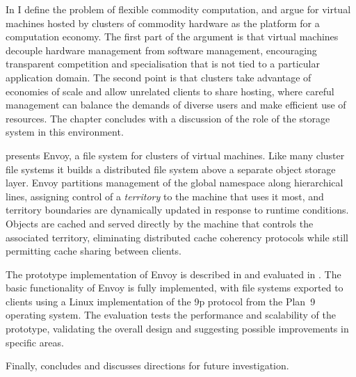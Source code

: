 In  I define the problem of flexible commodity computation, and argue for virtual machines hosted by clusters of commodity hardware as the platform for a computation economy. The first part of the argument is that virtual machines decouple hardware management from software management, encouraging transparent competition and specialisation that is not tied to a particular application domain. The second point is that clusters take advantage of economies of scale and allow unrelated clients to share hosting, where careful management can balance the demands of diverse users and make efficient use of resources. The chapter concludes with a discussion of the role of the storage system in this environment.

 presents Envoy, a file system for clusters of virtual machines. Like many cluster file systems it builds a distributed file system above a separate object storage layer. Envoy partitions management of the global namespace along hierarchical lines, assigning control of a \emph{territory} to the machine that uses it most, and territory boundaries are dynamically updated in response to runtime conditions. Objects are cached and served directly by the machine that controls the associated territory, eliminating distributed cache coherency protocols while still permitting cache sharing between clients.

The prototype implementation of Envoy is described in  and evaluated in . The basic functionality of Envoy is fully implemented, with file systems exported to clients using a Linux implementation of the 9p protocol from the Plan~9 operating system. The evaluation tests the performance and scalability of the prototype, validating the overall design and suggesting possible improvements in specific areas.

Finally,  concludes and discusses directions for future investigation.
